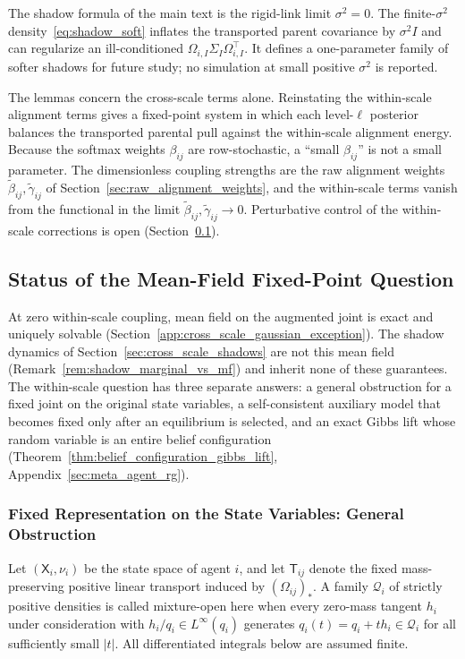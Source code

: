 \documentclass[11pt]{article}
\begin{document}
The shadow formula of the main text is the rigid-link limit $\sigma^2 = 0$. The finite-$\sigma^2$ density~\eqref{eq:shadow_soft} inflates the transported parent covariance by $\sigma^2 I$ and can regularize an ill-conditioned $\Omega_{i,I}\Sigma_I\Omega_{i,I}^\top$. It defines a one-parameter family of softer shadows for future study; no simulation at small positive $\sigma^2$ is reported.

The lemmas concern the cross-scale terms alone. Reinstating the within-scale alignment terms gives a fixed-point system in which each level-$\ell$ posterior balances the transported parental pull against the within-scale alignment energy. Because the softmax weights $\beta_{ij}$ are row-stochastic, a ``small $\beta_{ij}$'' is not a small parameter. The dimensionless coupling strengths are the raw alignment weights $\tilde\beta_{ij}, \tilde\gamma_{ij}$ of Section~\ref{sec:raw_alignment_weights}, and the within-scale terms vanish from the functional in the limit $\tilde\beta_{ij}, \tilde\gamma_{ij} \to 0$. Perturbative control of the within-scale corrections is open (Section~\ref{app:mf_fixedpoint_status}).

\subsection{Status of the Mean-Field Fixed-Point Question}
\label{app:mf_fixedpoint_status}

At zero within-scale coupling, mean field on the augmented joint is exact and uniquely solvable (Section~\ref{app:cross_scale_gaussian_exception}). The shadow dynamics of Section~\ref{sec:cross_scale_shadows} are not this mean field (Remark~\ref{rem:shadow_marginal_vs_mf}) and inherit none of these guarantees. The within-scale question has three separate answers: a general obstruction for a fixed joint on the original state variables, a self-consistent auxiliary model that becomes fixed only after an equilibrium is selected, and an exact Gibbs lift whose random variable is an entire belief configuration (Theorem~\ref{thm:belief_configuration_gibbs_lift}, Appendix~\ref{sec:meta_agent_rg}).

\subsubsection{Fixed Representation on the State Variables: General Obstruction}

Let $(\mathsf{X}_i,\nu_i)$ be the state space of agent $i$, and let $\mathsf{T}_{ij}$ denote the fixed mass-preserving positive linear transport induced by $(\Omega_{ij})_*$. A family $\mathcal{Q}_i$ of strictly positive densities is called mixture-open here when every zero-mass tangent $h_i$ under consideration with $h_i/q_i\in L^\infty(q_i)$ generates $q_i(t)=q_i+t h_i\in\mathcal{Q}_i$ for all sufficiently small $|t|$. All differentiated integrals below are assumed finite.
\end{document}
